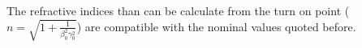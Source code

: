 The refractive indices than can be calculate from the turn on point ($n =  \sqrt{1+\frac{1}{\beta_0^2\gamma_0^2}}$) are compatible with the nominal values quoted before.



